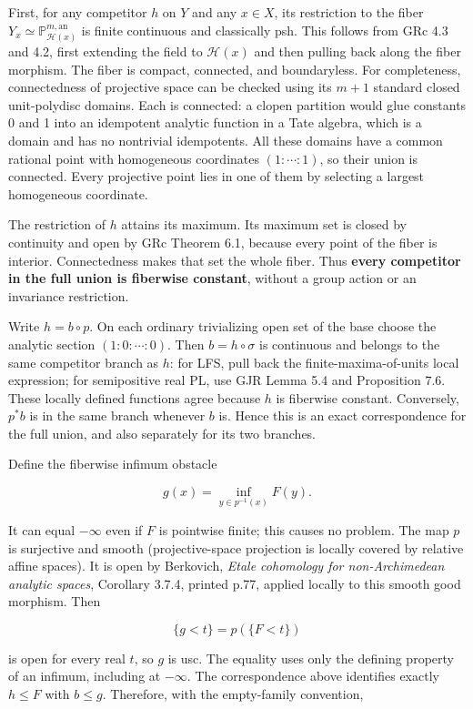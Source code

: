 \documentclass[
  11pt,
]{article}
\begin{document}
First, for any competitor \(h\) on \(Y\) and any \(x\in X\), its
restriction to the fiber
\(Y_x\simeq\mathbb P^{m,\mathrm{an}}_{\mathcal H(x)}\) is finite
continuous and classically psh. This follows from GRc 4.3 and 4.2, first
extending the field to \(\mathcal H(x)\) and then pulling back along the
fiber morphism. The fiber is compact, connected, and boundaryless. For
completeness, connectedness of projective space can be checked using its
\(m+1\) standard closed unit-polydisc domains. Each is connected: a
clopen partition would glue constants 0 and 1 into an idempotent
analytic function in a Tate algebra, which is a domain and has no
nontrivial idempotents. All these domains have a common rational point
with homogeneous coordinates \((1:\cdots:1)\), so their union is
connected. Every projective point lies in one of them by selecting a
largest homogeneous coordinate.

The restriction of \(h\) attains its maximum. Its maximum set is closed
by continuity and open by GRc Theorem 6.1, because every point of the
fiber is interior. Connectedness makes that set the whole fiber. Thus
\textbf{every competitor in the full union is fiberwise constant},
without a group action or an invariance restriction.

Write \(h=b\circ p\). On each ordinary trivializing open set of the base
choose the analytic section \((1:0:\cdots:0)\). Then \(b=h\circ\sigma\)
is continuous and belongs to the same competitor branch as \(h\): for
LFS, pull back the finite-maxima-of-units local expression; for
semipositive real PL, use GJR Lemma 5.4 and Proposition 7.6. These
locally defined functions agree because \(h\) is fiberwise constant.
Conversely, \(p^*b\) is in the same branch whenever \(b\) is. Hence this
is an exact correspondence for the full union, and also separately for
its two branches.

Define the fiberwise infimum obstacle

\[
g(x)=\inf_{y\in p^{-1}(x)}F(y).
\]

It can equal \(-\infty\) even if \(F\) is pointwise finite; this causes
no problem. The map \(p\) is surjective and smooth (projective-space
projection is locally covered by relative affine spaces). It is open by
Berkovich, \emph{Etale cohomology for non-Archimedean analytic spaces},
Corollary 3.7.4, printed p.77, applied locally to this smooth good
morphism. Then

\[
\{g<t\}=p(\{F<t\})
\]

is open for every real \(t\), so \(g\) is usc. The equality uses only
the defining property of an infimum, including at \(-\infty\). The
correspondence above identifies exactly \(h\leq F\) with \(b\leq g\).
Therefore, with the empty-family convention,
\end{document}
